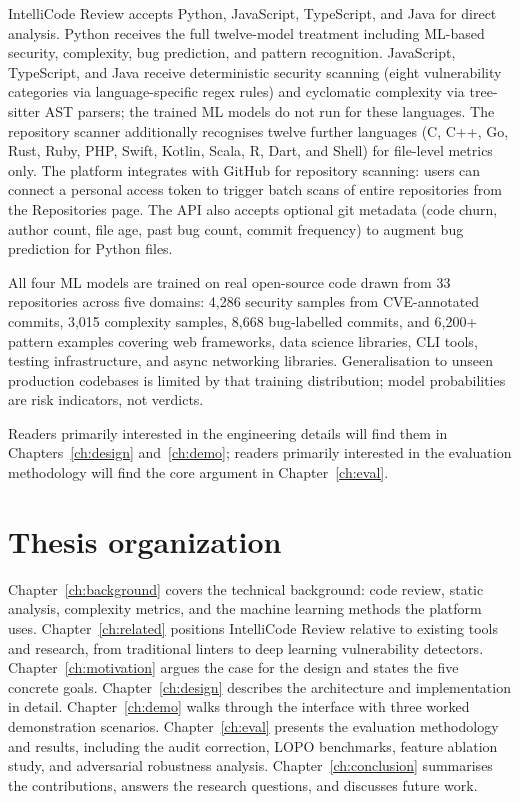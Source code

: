 \documentclass[12pt, oneside]{report}
\begin{document}
IntelliCode Review accepts Python, JavaScript, TypeScript, and Java for direct analysis.
Python receives the full twelve-model treatment including ML-based security, complexity,
bug prediction, and pattern recognition. JavaScript, TypeScript, and Java receive
deterministic security scanning (eight vulnerability categories via language-specific
regex rules) and cyclomatic complexity via tree-sitter AST parsers; the trained ML
models do not run for these languages. The repository scanner additionally recognises
twelve further languages (C, C++, Go, Rust, Ruby, PHP, Swift, Kotlin, Scala, R, Dart,
and Shell) for file-level metrics only. The platform integrates with GitHub for repository
scanning: users can connect a personal access token to trigger batch scans of entire
repositories from the Repositories page. The API also accepts optional git metadata
(code churn, author count, file age, past bug count, commit frequency) to augment bug
prediction for Python files.

All four ML models are trained on real open-source code drawn from 33 repositories
across five domains: 4,286 security samples from CVE-annotated commits, 3,015
complexity samples, 8,668 bug-labelled commits, and 6,200+ pattern examples covering
web frameworks, data science libraries, CLI tools, testing infrastructure, and
async networking libraries. Generalisation to unseen production codebases is limited by
that training distribution; model probabilities are risk indicators, not verdicts.

Readers primarily interested in the engineering details will find them in Chapters~\ref{ch:design} and~\ref{ch:demo}; readers primarily interested in the evaluation methodology will find the core argument in Chapter~\ref{ch:eval}.

\section{Thesis organization}
\label{sec:organization}

Chapter~\ref{ch:background} covers the technical background: code review, static
analysis, complexity metrics, and the machine learning methods the platform uses.
Chapter~\ref{ch:related} positions IntelliCode Review relative to existing tools and
research, from traditional linters to deep learning vulnerability detectors.
Chapter~\ref{ch:motivation} argues the case for the design and states the five concrete
goals. Chapter~\ref{ch:design} describes the architecture and implementation in detail.
Chapter~\ref{ch:demo} walks through the interface with three worked demonstration
scenarios. Chapter~\ref{ch:eval} presents the evaluation methodology and results,
including the audit correction, LOPO benchmarks, feature ablation study, and adversarial robustness analysis. Chapter~\ref{ch:conclusion}
summarises the contributions, answers the research questions, and discusses future work.
\end{document}
